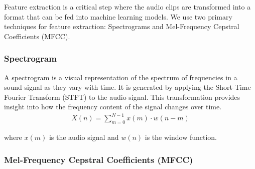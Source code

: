 Feature extraction is a critical step where the audio clips are transformed into a format that can be fed into machine learning models. We use two primary techniques for feature extraction: Spectrograms and Mel-Frequency Cepstral Coefficients (MFCC).

\subsubsection{Spectrogram}

A spectrogram is a visual representation of the spectrum of frequencies in a sound signal as they vary with time. It is generated by applying the Short-Time Fourier Transform (STFT) to the audio signal. This transformation provides insight into how the frequency content of the signal changes over time.
\begin{eqnarray}
    X(n) = \sum_{m=0}^{N-1} x(m) \cdot w(n-m) 
\end{eqnarray}

where \( x(m) \) is the audio signal and \( w(n) \) is the window function.

\subsubsection{Mel-Frequency Cepstral Coefficients (MFCC)}

